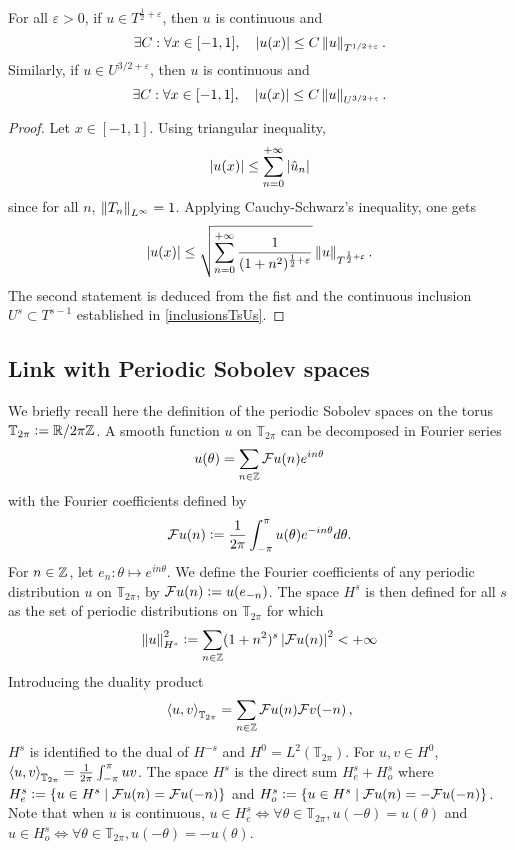 \documentclass[a4paper]{article}
\begin{document}
\begin{Lem}
	\label{LemInjectionsContinues}
	For all $\varepsilon >0$, if $u \in T^{\frac{1}{2} + \varepsilon}$, then $u$ is continuous and
	\[ \exists C : \forall x \in [-1,1], \quad \left\lvert u(x) \right\rvert \leq C \left\|u\right\|_{T^{1/2 + \varepsilon}}.\]	
	Similarly, if $u \in U^{3/2 + \varepsilon}$, then $u$ is continuous and 
	\[ \exists C : \forall x \in [-1,1], \quad \left\lvert u(x) \right\rvert \leq C \left\|u\right\|_{U^{3/2 + \varepsilon}}.\]
\end{Lem}
\begin{proof}
	Let $x \in [-1,1]$. Using triangular inequality,
	\[\left\lvert u(x) \right\rvert \leq \sum_{n = 0}^{+ \infty} \left\lvert \hat{u}_n \right\rvert\]
	since for all $n$, $\left\|T_n\right\|_{L^\infty} = 1$. Applying Cauchy-Schwarz's inequality, one gets
	\[\left\lvert u(x) \right\rvert \leq \sqrt{\sum_{n= 0}^{+ \infty} \frac{1}{(1+ n^2)^{\frac{1}{2}+ \varepsilon}}} \left\|u\right\|_{T^{\frac{1}{2} + \varepsilon}}.\]
	The second statement is deduced from the fist and the continuous inclusion $U^{s} \subset T^{s-1}$ established in \autoref{inclusionsTsUs}. 
\end{proof}	
\subsection{Link with Periodic Sobolev spaces}
We briefly recall here the definition of the periodic Sobolev spaces on the torus $\mathbb{T}_{2\pi} \mathrel{\mathop:}= \mathbb{R} / 2\pi \mathbb{Z}$. A smooth function $u$ on $\mathbb{T}_{2\pi}$ can be decomposed in Fourier series 
\[u(\theta) = \sum_{n \in \mathbb{Z}} \mathcal{F}u(n) e^{in\theta}\]
with the Fourier coefficients defined by 
\[\mathcal{F}u(n) \mathrel{\mathop:}= \frac{1}{2\pi}\int_{-\pi}^\pi u(\theta) e^{-in\theta}d\theta.\]
For $n\in \mathbb{Z}$, let $e_n : \theta \mapsto e^{in\theta}$. We define the Fourier coefficients of any periodic distribution $u$ on $\mathbb{T}_{2\pi}$, by $\mathcal{F}u(n) \mathrel{\mathop:}= u(e_{-n})$. The space $H^s$ is then defined for all $s$ as the set of periodic distributions on $\mathbb{T}_{2\pi}$ for which 
\[\left\|u\right\|_{H^s}^2 \mathrel{\mathop:}= \sum_{n \in \mathbb{Z}} (1 + n^{2})^s\left\lvert \mathcal{F}u(n) \right\rvert^2 < +\infty \]
Introducing the duality product
\begin{equation}
\label{dualiteSobolevPer}
\left\langle u,v\right\rangle_{\mathbb{T}_{2\pi}} = \sum_{n \in \mathbb{Z}} \mathcal{F}u(n) \mathcal{F}v(-n)\,,
\end{equation}
$H^s$ is identified to the dual of $H^{-s}$ and $H^0 = L^2(\mathbb{T}_{2\pi})$. For $u,v \in  H^0$, $\left\langle u,v\right\rangle_{\mathbb{T}_{2\pi}} = \frac{1}{2\pi} \int_{-\pi}^{\pi} uv$. The space $H^s$ is the direct sum $H^s_e + H^s_o$ where $H^s_e \mathrel{\mathop:}= \left\{u \in H^s\mathrel{}\middle|\mathrel{}\mathcal{F}u(n) = \mathcal{F}u(-n)\right\}$ and $H^s_o \mathrel{\mathop:}= \left\{u \in H^s\mathrel{}\middle|\mathrel{}\mathcal{F}u(n) = -\mathcal{F}u(-n)\right\}$. Note that when $u$ is continuous, $u \in H^s_e \iff \forall \theta \in \mathbb{T}_{2\pi}, u(-\theta) = u(\theta)$ and $u \in H^s_o \iff \forall \theta \in \mathbb{T}_{2\pi}, u(-\theta) = -u(\theta)$. 
\end{document}

